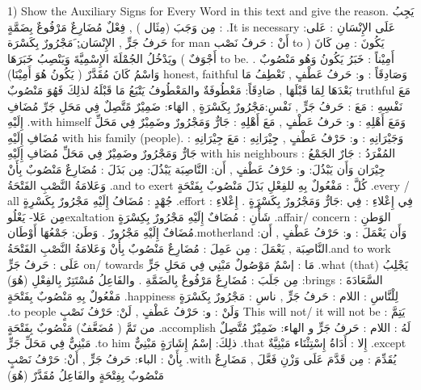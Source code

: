 \documentclass[a4paper]{article}
\begin{document}
\begin{flushright}
‏1) Show the Auxiliary Signs for Every Word in this text and give the reason.
يَجِبُ : مِن وَجَبَ (مِثَال ) , فِعْلٌ مُضَارِعٌ مَرْفُوعٌ بِضَمَّةٍ .It is necessary
عَلَى الإِنْسَانِ : عَلى: حَرفُ جَرٍّ , الإِنْسَان:ِ َمَجْرُورٌ بِكَسْرَة  for man
أَنْ : حَرفُ نَصْب to
يَكُونَ : مِن كَانَ ( أَجْوَفٌ ) ويَدْخُلُ الجُمْلَةَ الإِسْمِيَّةَ وَيَنْصِبُ خَبَرَهَا to be.
أَمِيْناً : خَبَرُ يَكُونُ وَهُو مَنْصُوبٌ . وَاسْمُ كَانَ مُقَدَّرٌ ( يَكُونُ هُوَ أَمِيْنَا) honest, faithful
وَصَادِقَاً : و: حَرفُ عَطْفٍ , تَعْطِفُ مَا بَعْدَهَا لِمَا قَبْلَهَا , صَادِقَاً: مَعْطُوفَةٌ
            والمَعْطُوفُ يَتْبَعُ مَا قَبْلَهُ لذلِكَ فَهُوَ مَنْصُوبٌ  truthful
مَعَ نَفْسِهِ : مَعَ : حَرفُ جَرٍّ , نَفْسِ:مَجْرُورٌ بِكَسْرَةٍ , الهَاء: ضَمِيْرٌ مًتَّصِلٌ
            فِي مَحَلِ جَرِّ مُضَافِ إِلَيْهِ .with himself
وَمَعَ أَهْلِهِ : و: حَرفُ عَطْفٍ , مَعَ أَهْلِهِ : جَارٌّ وَمَجْرُورٌ وضَمِيْرٌ فِي مَحَلِّ
            مُضَافِ إِلَيْهِ with his family (people).
وَجَيْرَانِهِ : و: حَرْفُ عَطْفٍ , جِِيْرَانِهِ : مَعَ جِيْرَانِهِ : جَارٌّ وَمَجْرُورٌ
                وضَمِيْرٌ فِي مَحَلِّ مُضَافِ إِلَيْهِ with his neighbours
                المُفْرَدُ : جَارٌ       الجَمْعُ : جِيْرَان
وَأَن يَبْذُلَ: و: حَرْفُ عَطْفٍ , أَن: النَّاصِبَة      يَبْذُلَ: مِن بَذَلَ : مُضَارِعٌ
            مَنْصُوبٌ بِأَنْ وَعَلامَةُ النَّصْبِ الفَتْحَةُ .and to exert
كُلَّ :          مَفْعُولٌ بِهِ للفِعْلِ بَذَلَ مَنْصُوبٌ بِفَتْحَةٍ .every / all
جُهْدٍ : مُضَافُ إِلَيْهِ مَجْرُورٌ بِكَسْرِةٍ .effort
فِي إِعْلاءِ : فِي :جَارٌّ وَمَجْرُورٌ بِكَسْرَةٍ . إِعْلاءِ : مِن عَلا- يَعْلُوexaltation
شَأْنِ : مُضَافٌ إِلَيْهِ مَجْرُورٌ بِكِسْرَةٍ .affair/ concern
الوَطنِ : مُضَافٌ إِلَيْهِ مَجْرُورٌ . وَطَن: جَمْعُهَا أَوْطَان.motherland
وَأَن يَعْمَلَ : و: حَرْفُ عَطْفٍ , أَن: النَّاصِبَة , يَعْمَلَ : مِن عَمِلَ : مُضَارِعٌ
            مَنْصُوبٌ بِأَنْ وَعَلامَةُ النَّصْبِ الفَتْحَةُ.and to work
عَلَى : حَرفُ جَرٍّ on/ towards
مَا : إسْمٌ مَوْصُولٌ مَبْنِي فِي مَحَلِ جَرٍّ .what (that)
يَجْلِبُ : مِن جَلَبَ : مُضَارِعٌ مَرْفُوعٌ بِالضَمَّةِ . والفَاعِلُ مُسْتَتِرٌ بِالفِعْلِ (هُوَ)brings
السَّعَادَةَ : مَفْعُولٌ بِهِ مَنْصُوبٌ بِفَتْحَةٍ .happiness
لِلْنَّاسِ : اللام : حَرفُ جَرٍّ ,  ناسِ : مَجْرُورٌ بِكَسْرَةٍ .to people
وَلَنْ : و: حَرْفُ عَطْفٍ ,  لَنْ: حَرْفُ نَصْبٍ This will not/ it will not be
يَتِمَّ : من تَمَّ ( مُضَعَّفٌ) مَنْصُوبٌ بِفَتْحَةٍ .accomplish
لَهُ : اللام : حَرفُ جَرٍّ  و الهاء: ضَمِيْرٌ مُتَّصِلٌ مَبْنِيٌّ فِي مَحَلِّ جَرٍّ .to him
ذلِكَ: إسْمُ إِشَارَةٍ مَبْنِيٌّ .that
إِلا : أَدَاةُ إِسْتِثْنَاء مَبْنِيَّةٌ .except
بِأَنْ : الباء: حَرفُ جَرٍّ ,  أَنْ: حَرْفُ نَصْبٍ .with
يُقَدِّمَ : مِن قَدَّمَ عَلَى وَزْنِ فَعَّلَ , مَضَارِعٌ مَنْصُوبٌ بِفِتْحَةٍ والفَاعِلُ مُقَدَّرٌ (هُوَ)

\end{flushright}
\end{document}
